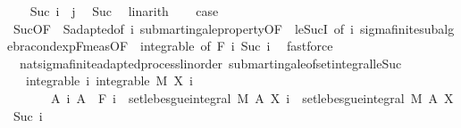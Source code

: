 \begin{isabellebody}
\ \ \isamarkupfalse%
\ {\isachardoublequoteopen}Suc\ i\ {\isasymle}\ j{\isachardoublequoteclose}\ \isamarkupfalse%
\ Suc{\isacharparenleft}{\kern0pt}{}{\isacharcomma}{\kern0pt}{}{\isacharparenright}{\kern0pt}\ \isamarkupfalse%
\ linarith\isanewline
\ \ \isamarkupfalse%
\ {\isacharquery}{\kern0pt}case\ \isamarkupfalse%
\ Suc{\isacharparenleft}{\kern0pt}{}{\isacharparenright}{\kern0pt}{\isacharbrackleft}{\kern0pt}OF\ {\isacharasterisk}{\kern0pt}{\isacharbrackright}{\kern0pt}\ S{\isachardot}{\kern0pt}adapted{\isacharbrackleft}{\kern0pt}of\ i{\isacharbrackright}{\kern0pt}\ submartingale{\isacharunderscore}{\kern0pt}property{\isacharbrackleft}{\kern0pt}OF\ {\isacharunderscore}{\kern0pt}\ le{\isacharunderscore}{\kern0pt}SucI{\isacharcomma}{\kern0pt}\ of\ i{\isacharbrackright}{\kern0pt}\ sigma{\isacharunderscore}{\kern0pt}finite{\isacharunderscore}{\kern0pt}subalgebra{\isachardot}{\kern0pt}cond{\isacharunderscore}{\kern0pt}exp{\isacharunderscore}{\kern0pt}F{\isacharunderscore}{\kern0pt}meas{\isacharbrackleft}{\kern0pt}OF\ {\isacharunderscore}{\kern0pt}\ integrable{\isacharcomma}{\kern0pt}\ of\ {\isachardoublequoteopen}F\ i{\isachardoublequoteclose}\ {\isachardoublequoteopen}Suc\ i{\isachardoublequoteclose}{\isacharbrackright}{\kern0pt}\ \isamarkupfalse%
\ fastforce\isanewline
{}\isamarkupfalse%
%
\endisatagproof
{\isafoldproof}%
%
\isadelimproof
\isanewline
%
\endisadelimproof
\isanewline
{}\isamarkupfalse%
\ {\isacharparenleft}{\kern0pt}\ nat{\isacharunderscore}{\kern0pt}sigma{\isacharunderscore}{\kern0pt}finite{\isacharunderscore}{\kern0pt}adapted{\isacharunderscore}{\kern0pt}process{\isacharunderscore}{\kern0pt}linorder{\isacharparenright}{\kern0pt}\ submartingale{\isacharunderscore}{\kern0pt}of{\isacharunderscore}{\kern0pt}set{\isacharunderscore}{\kern0pt}integral{\isacharunderscore}{\kern0pt}le{\isacharunderscore}{\kern0pt}Suc{\isacharcolon}{\kern0pt}\isanewline
\ \ \ integrable{\isacharcolon}{\kern0pt}\ {\isachardoublequoteopen}{\isasymAnd}i{\isachardot}{\kern0pt}\ integrable\ M\ {\isacharparenleft}{\kern0pt}X\ i{\isacharparenright}{\kern0pt}{\isachardoublequoteclose}\ \isanewline
\ \ \ \ \ \ \ {\isachardoublequoteopen}{\isasymAnd}A\ i{\isachardot}{\kern0pt}\ A\ {\isasymin}\ F\ i\ {\isasymLongrightarrow}\ set{\isacharunderscore}{\kern0pt}lebesgue{\isacharunderscore}{\kern0pt}integral\ M\ A\ {\isacharparenleft}{\kern0pt}X\ i{\isacharparenright}{\kern0pt}\ {\isasymle}\ set{\isacharunderscore}{\kern0pt}lebesgue{\isacharunderscore}{\kern0pt}integral\ M\ A\ {\isacharparenleft}{\kern0pt}X\ {\isacharparenleft}{\kern0pt}Suc\ i{\isacharparenright}{\kern0pt}{\isacharparenright}{\kern0pt}{\isachardoublequoteclose}\ \isanewline

\end{isabellebody}
